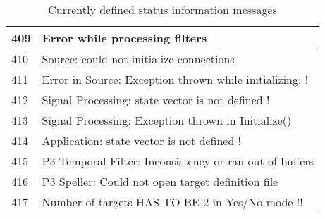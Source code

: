 \begin{table}[ht]
\begin{tabular}{|l|l|}
  \hline
  409 & Error while processing filters \\
  \hline
  410 & Source: could not initialize connections \\
  \hline
  411 & Error in Source: Exception thrown while initializing: !\\
  \hline
  412 & Signal Processing: state vector is not defined ! \\
  \hline
  413 & Signal Processing: Exception thrown in Initialize() \\
  \hline
  414 & Application: state vector is not defined ! \\
  \hline
  415 & P3 Temporal Filter: Inconsistency or ran out of buffers \\
  \hline
  416 & P3 Speller: Could not open target definition file \\
  \hline
  417 & Number of targets HAS TO BE 2 in Yes/No mode !! \\
  \hline
 \end{tabular}
 \caption{Currently defined status information messages}
 \label{stat_info_mess}
\end{table}   
